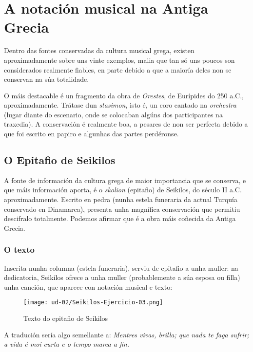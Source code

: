 %
%
\section{A notación musical na Antiga Grecia}


Dentro das fontes conservadas da cultura musical grega, existen aproximadamente sobre uns vinte exemplos, malia que tan só uns poucos son considerados realmente fiables, en parte debido a que a maioría deles non se conservan na súa totalidade. 

O máis destacable é un fragmento da obra de \textit{Orestes}, de Eurípides do 250 a.C., aproximadamente. Trátase dun \textit{stasimon}, isto é, un coro cantado na \textit{orchestra} (lugar diante do escenario, onde se colocaban algúns dos participantes na traxedia). A conservación é realmente boa, a pesares de non ser perfecta debido a que foi escrito en papiro e algunhas das partes perdéronse.

\subsection*{O Epitafio de Seikilos}

A fonte de información da cultura grega de maior importancia que se conserva, e que máis información aporta, é o \textit{skolion} (epitafio) de Seikilos, do século II a.C. aproximadamente. Escrito en pedra (nunha estela funeraria da actual Turquía conservado en Dinamarca), presenta unha magnífica conservación que permitiu descifralo totalmente. Podemos afirmar que é a obra máis coñecida da Antiga Grecia.

\subsubsection*{O texto}

Inscrita nunha columna (estela funeraria), serviu de epitafio a unha muller: na dedicatoria, Seikilos ofrece a unha muller (probablemente a súa esposa ou filla) unha canción, que aparece con notación musical e texto:

\begin{figure}[htp]
\centering
\texttt{[image: ud-02/Seikilos-Ejercicio-03.png]}
\caption{Texto do epitafio de Seikilos}
\label{Seikilos-texto}
\end{figure}

A tradución sería algo semellante a: \textit{ Mentres vivas, brilla; que nada te faga sufrir; a vida é moi curta e o tempo marca a fin.}

